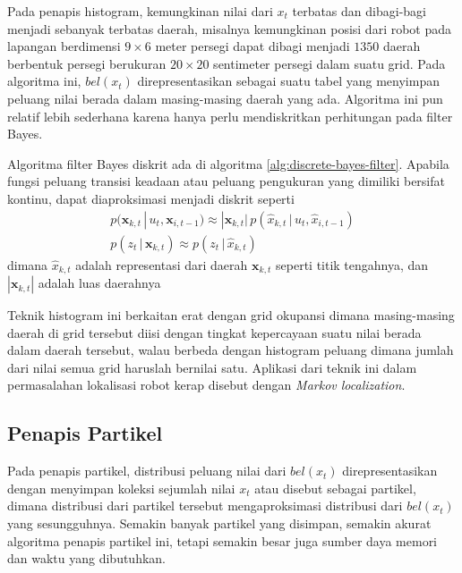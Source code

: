 Pada penapis histogram, kemungkinan nilai dari $x_t$ terbatas dan dibagi-bagi menjadi sebanyak terbatas daerah, misalnya kemungkinan posisi dari robot pada lapangan berdimensi $9 \times 6$ meter persegi dapat dibagi menjadi $1350$ daerah berbentuk persegi berukuran $20 \times 20$ sentimeter persegi dalam suatu grid. Pada algoritma ini, $bel(x_t)$ direpresentasikan sebagai suatu tabel yang menyimpan peluang nilai berada dalam masing-masing daerah yang ada. Algoritma ini pun relatif lebih sederhana karena hanya perlu mendiskritkan perhitungan pada filter Bayes.

Algoritma filter Bayes diskrit ada di algoritma \ref{alg:discrete-bayes-filter}. Apabila fungsi peluang transisi keadaan atau peluang pengukuran yang dimiliki bersifat kontinu, dapat diaproksimasi menjadi diskrit seperti
\begin{align}
    p(\mathbf{x}_{k, t} \,|\, u_t, \mathbf{x}_{i, t-1}) \approx |\mathbf{x}_{k, t}|\, p(\hat{x}_{k, t} \,|\, u_t, \hat{x}_{i, t-1}) \\
    p(z_t \,|\, \mathbf{x}_{k, t}) \approx p(z_t \,|\, \hat{x}_{k, t})
\end{align}
dimana $\hat{x}_{k, t}$ adalah representasi dari daerah $\mathbf{x}_{k, t}$ seperti titik tengahnya, dan $|\mathbf{x}_{k, t}|$ adalah luas daerahnya

Teknik histogram ini berkaitan erat dengan grid okupansi dimana masing-masing daerah di grid tersebut diisi dengan tingkat kepercayaan suatu nilai berada dalam daerah tersebut, walau berbeda dengan histogram peluang dimana jumlah dari nilai semua grid haruslah bernilai satu. Aplikasi dari teknik ini dalam permasalahan lokalisasi robot kerap disebut dengan \textit{Markov localization}.

\subsection{Penapis Partikel}

Pada penapis partikel, distribusi peluang nilai dari $bel(x_t)$ direpresentasikan dengan menyimpan koleksi sejumlah nilai $x_t$ atau disebut sebagai partikel, dimana distribusi dari partikel tersebut mengaproksimasi distribusi dari $bel(x_t)$ yang sesungguhnya. Semakin banyak partikel yang disimpan, semakin akurat algoritma penapis partikel ini, tetapi semakin besar juga sumber daya memori dan waktu yang dibutuhkan.

